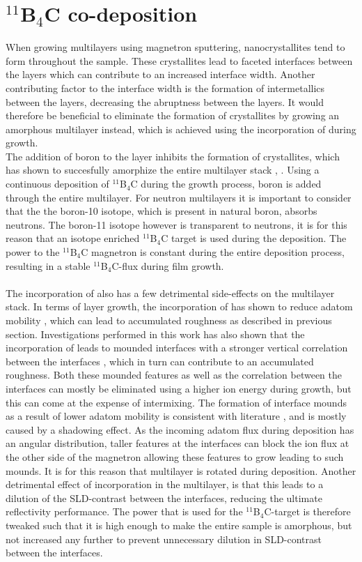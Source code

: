 \section{$^{11}$B$_4$C co-deposition}
When growing multilayers using magnetron sputtering, nanocrystallites tend to form throughout the sample. These crystallites lead to faceted interfaces between the layers which  can contribute to an increased interface width. Another contributing factor to the interface width is the formation of intermetallics between the layers, decreasing the abruptness between the layers. It would therefore be beneficial to eliminate the formation of crystallites by growing an amorphous multilayer instead, which is achieved using the incorporation of \BC during growth. \\
The addition of boron to the layer inhibits the formation of crystallites, which has shown to succesfully amorphize the entire multilayer stack \cite{characterization_paper}, \cite{morphology_paper}. Using a continuous deposition of $^{11}$B$_4$C during the  growth process, boron is added through the entire multilayer. For neutron multilayers it is important to consider that the the boron-10 isotope, which is present in natural boron, absorbs neutrons.  The boron-11 isotope however is transparent to neutrons, it is for this reason that an isotope enriched $^{11}$B$_4$C target is used during the deposition. The power to the $^{11}$B$_4$C magnetron is constant during the entire deposition process, resulting in a stable $^{11}$B$_4$C-flux during film growth.  \\
\\
The incorporation of \BC also has a few detrimental side-effects on the multilayer stack. In terms of layer growth, the incorporation of \natBC has shown to reduce adatom mobility \cite{b4c_effects}, which can lead to accumulated roughness as described in previous section. Investigations performed in this work has also shown that the incorporation of \BC leads to mounded interfaces with a stronger vertical correlation between the interfaces \cite{GISAXS_paper}, which in turn can contribute to an accumulated roughness. Both these mounded features as well as the correlation between the interfaces can mostly be eliminated using a higher ion energy during growth, but this can come at the expense of intermixing. The formation of interface mounds as a result of lower adatom mobility is consistent with literature \cite{Pelliccione}, and is mostly caused by a shadowing effect. As the incoming adatom flux during deposition has an angular distribution, taller features at the interfaces can block the ion flux at the other side of the magnetron allowing these features to grow leading to such mounds. It is for this reason that multilayer is rotated during deposition.  Another detrimental effect of \BC incorporation in the multilayer, is that this leads to a dilution of the SLD-contrast between the interfaces, reducing the ultimate reflectivity performance. The power that is used for the  $^{11}$B$_4$C-target is therefore tweaked such that it is high enough to make the entire sample is amorphous, but not increased any further to prevent unnecessary dilution in SLD-contrast between the interfaces. 
